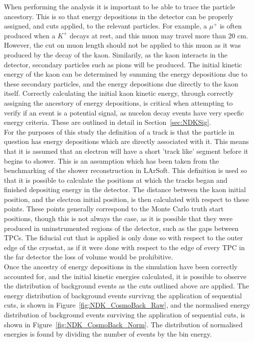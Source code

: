 When performing the analysis it is important to be able to trace the particle ancestory. This is so that energy depositions in the detector can be properly assigned, and cuts applied, to the relevant particles. For example, a $\mu^{+}$ is often produced when a $K^{+}$ decays at rest, and this muon may travel more than 20 cm. However, the cut on muon length should not be applied to this muon as it was produced by the decay of the kaon. Similarily, as the kaon interacts in the detector, secondary particles such as pions will be produced. The initial kinetic energy of the kaon can be determined by summing the energy depositions due to these secondary particles, and the energy depositions due directly to the kaon itself. Correctly calculating the initial kaon kinetic energy, through correctly assigning the ancestory of energy depositions, is critical when attempting to verify if an event is a potential signal, as nucelon decay events have very specfic energy criteria. These are outlined in detail in Section~\ref{sec:NDKSig}. \\

For the purposes of this study the definition of a track is that the particle in question has energy depositions which are directly associated with it. This means that it is assumed that an electron will have a short 'track like' segment before it begins to shower. This is an assumption which has been taken from the benchmarking of the shower reconstruction in LArSoft. This definition is used so that it is possible to calculate the positions at which the tracks began and finished depositing energy in the detector. The distance between the kaon initial position, and the electron initial position, is then calculated with respect to these points. These points generally correspond to the Monte Carlo truth start positions, though this is not always the case, as it is possible that they were produced in uninstrumented regions of the detector, such as the gaps between TPCs. The fiducial cut that is applied is only done so with respect to the outer edge of the cryostat, as if it were done with respect to the edge of every TPC in the far detector the loss of volume would be prohibitive. \\

Once the ancestry of energy depositions in the simulation have been correctly accounted for, and the initial kinetic energies calculated, it is possible to observe the distribution of background events as the cuts outlined above are applied. The energy distribution of background events survivng the application of sequential cuts, is shown in Figure~\ref{fig:NDK_CosmoBack_Raw}, and the normalised energy distribution of background events surviving the application of sequential cuts, is shown in Figure~\ref{fig:NDK_CosmoBack_Norm}. The distribution of normalised energies is found by dividing the number of events by the bin energy. \\

